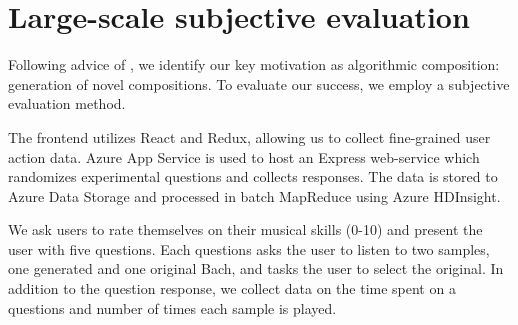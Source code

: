 \documentclass[dissertation.tex]{subfiles}
\begin{document}
\chapter{Large-scale subjective evaluation}

Following advice of \cite{pearce2002motivations}, we identify our key
motivation as algorithmic composition: generation of novel compositions.
To evaluate our success, we employ a subjective evaluation method.


The frontend utilizes React and Redux, allowing us to collect fine-grained user
action data. Azure App Service is used to host an Express web-service which
randomizes experimental questions and collects responses. The data is stored to
Azure Data Storage and processed in batch MapReduce using Azure HDInsight.

We ask users to rate themselves on their musical skills (0-10) and present the
user with five questions. Each questions asks the user to listen to two
samples, one generated and one original Bach, and tasks the user to select the
original. In addition to the question response, we collect data on the time
spent on a questions and number of times each sample is played.

\printbibliography
\end{document}
